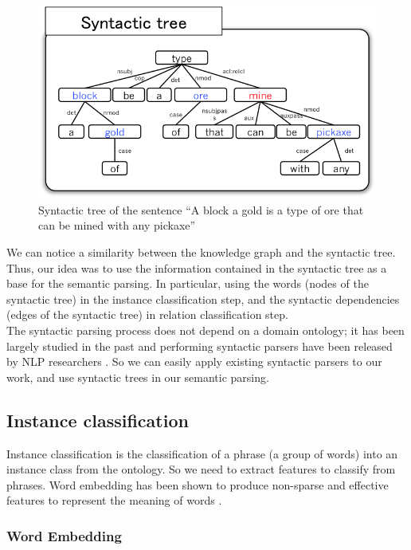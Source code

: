 \documentclass[twocolumn]{article}
\begin{document}
\begin{figure}[t]
	\centering \includegraphics[width=\linewidth]{Figures/Semantic_Parsing/syntacticTree.png}
	\caption{\label{syntacticTree}Syntactic tree of the sentence ``A block a gold is a type of ore that can be mined with any pickaxe''}
\end{figure}

We can notice a similarity between the knowledge graph and the syntactic tree. Thus, our idea was to use the information contained in the syntactic tree as a base for the semantic parsing. In particular, using the words (nodes of the syntactic tree) in the instance classification step, and the syntactic dependencies (edges of the syntactic tree) in relation classification step.\\
The syntactic parsing process does not depend on a domain ontology; it has been largely studied in the past and performing syntactic parsers have been released by NLP researchers \cite{chen2014fast,andor2016globally}. So we can easily apply existing syntactic parsers to our work, and use syntactic trees in our semantic parsing.

\subsection{Instance classification}

Instance classification is the classification of a phrase (a group of words) into an instance class from the ontology. So we need to extract features to classify from phrases. Word embedding has been shown to produce non-sparse and effective features to represent the meaning of words \cite{mikolov2013efficient}.

\subsubsection{Word Embedding}
\end{document}
